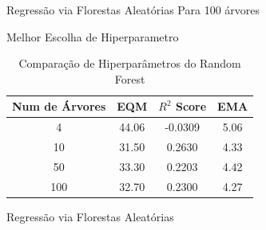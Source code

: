 \begin{frame}{Regressão via Florestas Aleatórias}
	Para 100 árvores
	\centering
	
\end{frame}

\begin{frame}{Melhor Escolha de Hiperparametro}
\begin{table}[h!]
	\centering
	\caption{Comparação de Hiperparâmetros do Random Forest}
	\begin{tabular}{|c|c|c|c|}
		\hline
		\textbf{Num de Árvores} & \textbf{EQM} & \textbf{$R^2$ Score} & \textbf{EMA} \\
		\hline
		4  & 44.06 & -0.0309 & 5.06 \\
		10 & 31.50 &  0.2630 & 4.33 \\
		50 & 33.30 &  0.2203 & 4.42 \\
		100 & 32.70 &  0.2300 & 4.27 \\
		\hline
	\end{tabular}
\end{table}

\end{frame}



\begin{frame}{Regressão via Florestas Aleatórias}
	\centering
	
\end{frame}
